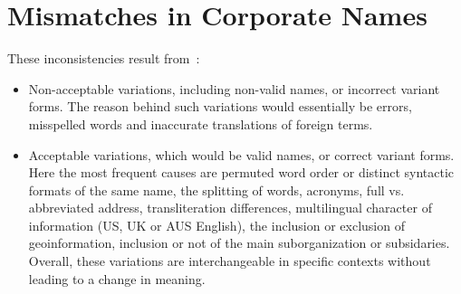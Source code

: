 \documentclass{llncs}
\begin{document}
% 
% 

% 
% 

% 
% 


\section{Mismatches in Corporate Names}
These inconsistencies result from~\cite{Galvez2006,Morillo:2013:TAA:2424697.2424727}:
\begin{itemize}
 \item Non-acceptable variations, including non-valid names, or incorrect
variant forms. The reason behind such variations would essentially be
errors, misspelled words and inaccurate translations of foreign terms.

\item Acceptable variations, which would be valid names, or correct variant
forms. Here the most frequent causes are permuted word order or distinct
syntactic formats of the same name, the splitting of words, acronyms, full
vs. abbreviated address, transliteration differences, multilingual character 
of information (US, UK or AUS English), the inclusion or exclusion of geoinformation, 
inclusion or not of the main suborganization or subsidaries. Overall, these variations are 
interchangeable in specific contexts without leading to a change in meaning.
\end{itemize}



% 
% 
% 
\end{document}
